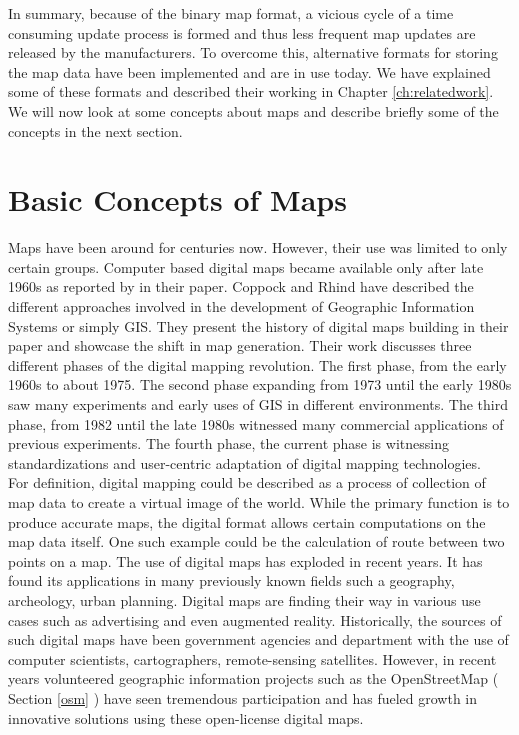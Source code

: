 In summary, because of the binary map format, a vicious cycle of a time consuming update process is formed and thus less frequent map updates are released by the manufacturers. To overcome this, alternative formats for storing the map data have been implemented and are in use today. We have explained some of these formats and described their working in Chapter \ref{ch:relatedwork}. We will now look at some concepts about maps and describe briefly some of the concepts in the next section.


\section{Basic Concepts of Maps}
Maps have been around for centuries now. However, their use was limited to only certain groups. Computer based digital maps became available only after late 1960s as reported by \citet{coppock1991history} in their paper. Coppock and Rhind have described the different approaches involved in the development of Geographic Information Systems or simply GIS. They present the history of digital maps building in their paper and showcase the shift in map generation. Their work discusses three different phases of the digital mapping revolution. The first phase, from the early 1960s to about 1975. The second phase expanding from 1973 until the early 1980s saw many experiments and early uses of GIS in different environments. The third phase, from 1982 until the late 1980s witnessed many commercial applications of previous experiments. The fourth phase, the current phase is witnessing standardizations and user-centric adaptation of digital mapping technologies.\\


For definition, digital mapping could be described as a process of collection of map data to create a virtual image of the world. While the primary function is to produce accurate maps, the digital format allows certain computations on the map data itself. One such example could be the calculation of route between two points on a map. The use of digital maps has exploded in recent years. It has found its applications in many previously known fields such a geography, archeology, urban planning. Digital maps are finding their way in various use cases such as advertising and even augmented reality. Historically, the sources of such digital maps have been government agencies and department with the use of computer scientists, cartographers, remote-sensing satellites. However, in recent years volunteered geographic information projects such as the OpenStreetMap ( Section \ref{osm} ) have seen tremendous participation and has fueled growth in innovative solutions using these open-license digital maps. 

